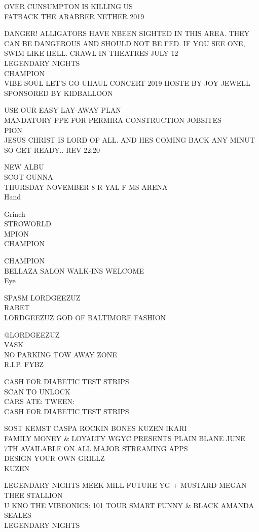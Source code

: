 \documentclass[10pt,letterpaper]{article}
\begin{document}
OVER CUNSUMPTON IS KILLING US\\
FATBACK THE ARABBER NETHER 2019

DANGER! ALLIGATORS HAVE NBEEN SIGHTED IN THIS AREA. THEY CAN BE DANGEROUS AND SHOULD NOT BE FED. IF YOU SEE ONE, SWIM LIKE HELL.  CRAWL IN THEATRES JULY 12\\
LEGENDARY NIGHTS\\
CHAMPION\\
VIBE SOUL LET'S GO UHAUL CONCERT 2019 HOSTE BY JOY JEWELL SPONSORED BY KIDBALLOON

USE OUR EASY LAY{-}AWAY PLAN\\
MANDATORY PPE FOR PERMIRA CONSTRUCTION JOBSITES\\
PION\\
JESUS CHRIST IS LORD OF ALL.  AND HES COMING BACK ANY MINUT SO GET READY.. REV 22:20

NEW ALBU\\
SCOT GUNNA\\
THURSDAY NOVEMBER 8 R YAL F MS ARENA\\
Hand

Grinch\\
STROWORLD\\
MPION\\
CHAMPION

CHAMPION\\
BELLAZA SALON WALK{-}INS WELCOME\\
Eye

SPASM LORDGEEZUZ\\
RABET\\
LORDGEEZUZ GOD OF BALTIMORE FASHION

@LORDGEEZUZ\\
VASK\\
NO PARKING TOW AWAY ZONE\\
R.I.P. FYBZ

CASH FOR DIABETIC TEST STRIPS\\
SCAN TO UNLOCK\\
CARS ATE: TWEEN:\\
CASH FOR DIABETIC TEST STRIPS

SOST KEMST CASPA ROCKIN BONES KUZEN IKARI\\
FAMILY MONEY \& LOYALTY WGYC PRESENTS PLAIN BLANE JUNE 7TH AVAILABLE ON ALL MAJOR STREAMING APPS\\
DESIGN YOUR OWN GRILLZ\\
KUZEN

LEGENDARY NIGHTS MEEK MILL FUTURE YG + MUSTARD MEGAN THEE STALLION\\
U KNO THE VIBEONICS: 101 TOUR SMART FUNNY \& BLACK AMANDA SEALES\\
LEGENDARY NIGHTS
\end{document}
